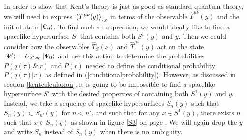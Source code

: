 In order to show that Kent's theory is just as good as standard quantum theory, we will need to express $\ev*{T^{\mu\nu}(y)}_{\tau_S}$ in terms of the observable $\hat{T}^{\mu\nu}(y)$ and the initial state $\ket{\Psi_0}$. To find such an expression, we would ideally like to find a spacelike hypersurface $S'$ that contains both $S^1(y)$ and $y$. Then we could consider how the observables $\hat{T}_S(x)$ and $\hat{T}^{\mu\nu}(y)$ act on the state $\ket{\Psi'}=U_{S'S_0}\ket{\Psi_0}$ and use this action to determine the probabilities $P(q(\tau)\, \& \, r)$ and $P(r)$ needed to define the conditional probability $P(q(\tau)|r)$ as defined in (\ref{conditionalprobability}). However, as discussed in section \ref{kentcalculation}, it is going to be impossible to find a spacelike hypersurface $S'$ with the desired properties of containing both $S^1(y)$ and $y$. Instead, we take a sequence of spacelike hypersurfaces $S_n(y)$ such that\label{siydef} $S_n(y)\subset S_{n'}(y)$ for $n<n'$, and such that for any $x\in S^1(y)$, there exists $n$ such that $x\in S_n(y)$ as shown in figure \ref{S3} on page \pageref{S3}. We will again drop the $y$ and write $S_n$ instead of $S_n(y)$ when there is no ambiguity. 

